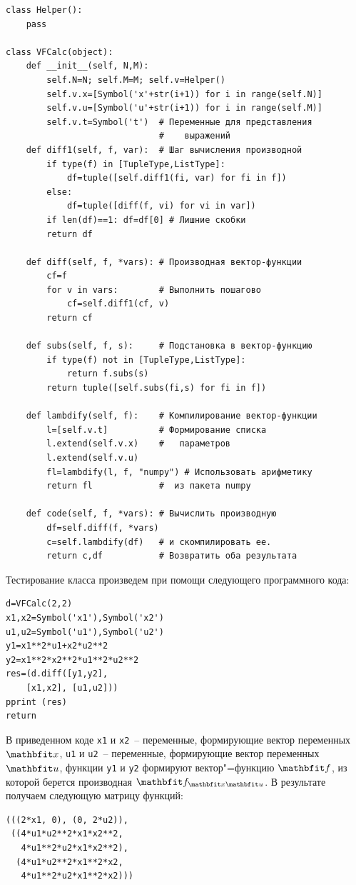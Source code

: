 \documentclass[a4paper,14pt, openany, twoside, final]{extbook} %
\begin{document}
\begin{verbatim}
class Helper():
    pass

class VFCalc(object):
    def __init__(self, N,M):
        self.N=N; self.M=M; self.v=Helper()
        self.v.x=[Symbol('x'+str(i+1)) for i in range(self.N)]
        self.v.u=[Symbol('u'+str(i+1)) for i in range(self.M)]
        self.v.t=Symbol('t')  # Переменные для представления
                              #    выражений
    def diff1(self, f, var):  # Шаг вычисления производной
        if type(f) in [TupleType,ListType]:
            df=tuple([self.diff1(fi, var) for fi in f])
        else:
            df=tuple([diff(f, vi) for vi in var])
        if len(df)==1: df=df[0] # Лишние скобки
        return df

    def diff(self, f, *vars): # Производная вектор-функции
        cf=f
        for v in vars:        # Выполнить пошагово
            cf=self.diff1(cf, v)
        return cf

    def subs(self, f, s):     # Подстановка в вектор-функцию
        if type(f) not in [TupleType,ListType]:
            return f.subs(s)
        return tuple([self.subs(fi,s) for fi in f])

    def lambdify(self, f):    # Компилирование вектор-функции
        l=[self.v.t]          # Формирование списка
        l.extend(self.v.x)    #   параметров
        l.extend(self.v.u)
        fl=lambdify(l, f, "numpy") # Использовать арифметику
        return fl             #  из пакета numpy

    def code(self, f, *vars): # Вычислить производную
        df=self.diff(f, *vars)
        c=self.lambdify(df)   # и скомпилировать ее.
        return c,df           # Возвратить оба результата
\end{verbatim}

Тестирование класса произведем при помощи следующего программного кода:

\begin{verbatim}
d=VFCalc(2,2)
x1,x2=Symbol('x1'),Symbol('x2')
u1,u2=Symbol('u1'),Symbol('u2')
y1=x1**2*u1+x2*u2**2
y2=x1**2*x2**2*u1**2*u2**2
res=(d.diff([y1,y2],
    [x1,x2], [u1,u2]))
pprint (res)
return
\end{verbatim}

В приведенном коде \texttt{x1} и \texttt{x2}~-- переменные, формирующие вектор переменных $\vecx$, \texttt{u1} и \texttt{u2}~-- переменные, формирующие вектор переменных $\vecu$, функции \texttt{y1} и \texttt{y2} формируют вектор"=функцию $\vecf$, из которой берется производная $\vecf_{\vecx\vecu}$.  В результате получаем следующую матрицу функций:
\begin{verbatim}
(((2*x1, 0), (0, 2*u2)),
 ((4*u1*u2**2*x1*x2**2,
   4*u1**2*u2*x1*x2**2),
  (4*u1*u2**2*x1**2*x2,
   4*u1**2*u2*x1**2*x2)))
\end{verbatim}
\end{document}
